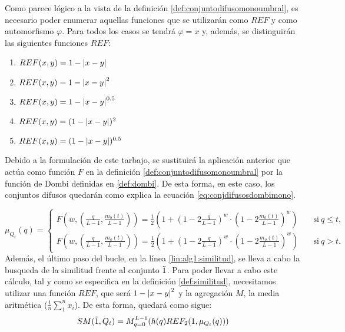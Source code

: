 Como parece lógico a la vista de la definición \ref{def:conjuntodifusomonoumbral}, es necesario poder enumerar aquellas funciones que se utilizarán como $REF$ y como automorfismo $\varphi$. Para todos los casos se tendrá $\varphi = x$ y, además, se distinguirán las siguientes funciones $REF$:
\begin{enumerate}
    \item $REF(x,y)=1-\left\vert x-y\right\vert$
    \item $REF(x,y)=1-\left\vert x-y\right\vert^2$
    \item $REF(x,y)=1-\left\vert x-y\right\vert^{0.5}$
    \item $REF(x,y)=(1-\left\vert x-y\right\vert)^2$
    \item $REF(x,y)=(1-\left\vert x-y\right\vert)^{0.5}$
\end{enumerate}

Debido a la formulación de este tarbajo, se sustituirá la aplicación anterior que actúa como función $F$ en la definición \ref{def:conjuntodifusomonoumbral} por la función de Dombi \cite{art:dombi} definidas en \ref{def:dombi}. De esta forma, en este caso, los conjuntos difusos quedarán como explica la ecuación \ref{eq:conjdifusosdombimono}.

\begin{equation} \label{eq:conjdifusosdombimono}
    \mu_{Q_t}(q) = \left\{ \begin{aligned}
        F \left(w,\left(\frac{q}{L-1}, \frac{m_b(t)}{L-1}\right)\right) = \frac{1}{2}\left(1 + \left(1-2\frac{q}{L-1}\right)^w\cdot\left(1-2\frac{m_b(t)}{L-1}\right)^w\right)& \quad\text{si}\ q\leq t,\\
        F \left(w,\left(\frac{q}{L-1}, \frac{m_o(t)}{L-1}\right)\right) = \frac{1}{2}\left(1 + \left(1-2\frac{q}{L-1}\right)^w\cdot\left(1-2\frac{m_o(t)}{L-1}\right)^w\right)& \quad\text{si}\ q> t.
     \end{aligned}\right.
\end{equation}
Además, el último paso del bucle, en la línea \ref{lin:alg1:similitud}, se lleva a cabo la busqueda de la similitud frente al conjunto $\tilda1$. Para poder llevar a cabo este cálculo, tal y como se especifica en la definición \ref{def:similitud}, necesitamos utilizar una función $REF$, que será $1-\left\vert x-y\right\vert^2$ y la agregación $M$, la media aritmética ($\frac{1}{n}\sum_1^n x_i$). De esta forma, quedará como sigue:
\begin{equation}\label{eq:similitud}
    SM(\tilda1, Q_{t}) = M^{L-1}_{q=0}(h(q)REF_2(1,\mu_{Q_t}(q)))
\end{equation}


